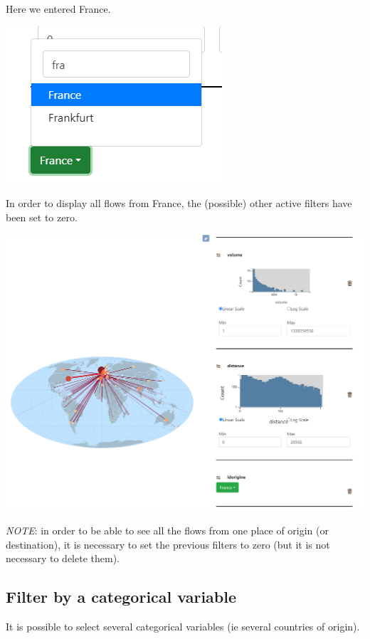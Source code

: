 \documentclass[
  letterpaper,
  DIV=11,
  numbers=noendperiod]{scrreprt}
\begin{document}
Here we entered France.

\begin{center}
\includegraphics{images/Add_filter_links_origin_categorial_SelectFrance.png}
\end{center}

In order to display all flows from France, the (possible) other active
filters have been set to zero.

\includegraphics{images/Add_links_filter_origin_France.png}

\emph{NOTE}: in order to be able to see all the flows from one place of
origin (or destination), it is necessary to set the previous filters to
zero (but it is not necessary to delete them).

\subsection{Filter by a categorical
variable}\label{filter-by-a-categorical-variable}

It is possible to select several categorical variables (ie several
countries of origin).
\end{document}
